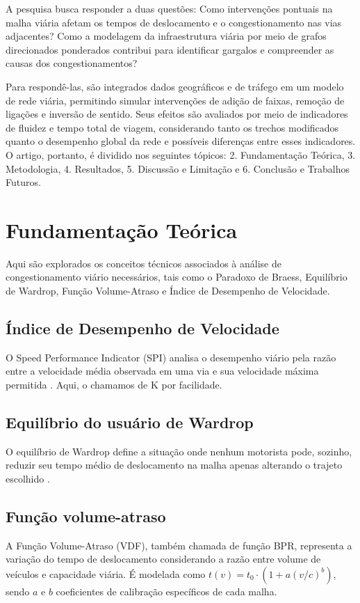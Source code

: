 \documentclass[portuguese]{sbc2025}%
\begin{document}
A pesquisa busca responder a duas questões: Como intervenções pontuais na malha viária afetam os tempos de deslocamento e o congestionamento nas vias adjacentes? Como a modelagem da infraestrutura viária por meio de grafos direcionados ponderados contribui para identificar gargalos e compreender as causas dos congestionamentos?

Para respondê-las, são integrados dados geográficos e de tráfego em um modelo de rede viária, permitindo simular intervenções de adição de faixas, remoção de ligações e inversão de sentido. Seus efeitos são avaliados por meio de indicadores de fluidez e tempo total de viagem, considerando tanto os trechos modificados quanto o desempenho global da rede e possíveis diferenças entre esses indicadores. O artigo, portanto, é dividido nos seguintes tópicos: 2. Fundamentação Teórica, 3. Metodologia, 4. Resultados, 5. Discussão e Limitação e 6. Conclusão e Trabalhos Futuros.
 
\section{Fundamentação Teórica}
Aqui são explorados os conceitos técnicos associados à análise de congestionamento viário necessários, tais como o Paradoxo de Braess, Equilíbrio de Wardrop, Função Volume-Atraso e Índice de Desempenho de Velocidade.

\subsection{Índice de Desempenho de Velocidade}
O Speed Performance Indicator (SPI) analisa o desempenho viário pela razão entre a velocidade média observada em uma via e sua velocidade máxima permitida \cite{he2016spi}. Aqui, o chamamos de K por facilidade.

\subsection{Equilíbrio do usuário de Wardrop}
O equilíbrio de Wardrop define a situação onde nenhum motorista pode, sozinho, reduzir seu tempo médio de deslocamento na malha apenas alterando o trajeto escolhido \cite{wardrop1952}.

\subsection{Função volume-atraso}
A Função Volume-Atraso (VDF), também chamada de função BPR, representa a variação do tempo de deslocamento considerando a razão entre volume de veículos e capacidade viária. É modelada como $t(v) = t_0 \cdot (1 + a(v/c)^b)$, sendo $a$ e $b$ coeficientes de calibração específicos de cada malha.
\end{document}
